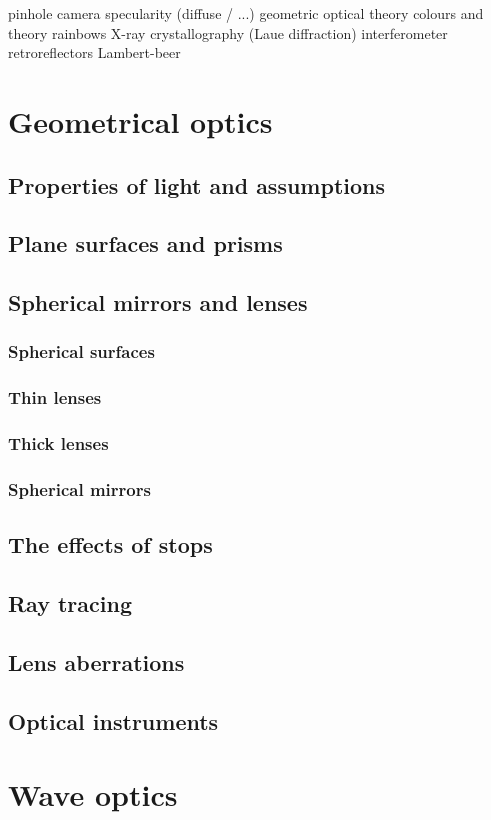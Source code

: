 pinhole camera
specularity (diffuse / ...)
geometric optical theory
colours and theory
rainbows
X-ray crystallography (Laue diffraction)
interferometer
retroreflectors
Lambert-beer


\chapter{Geometrical optics}
\section{Properties of light and assumptions}
\section{Plane surfaces and prisms}
\section{Spherical mirrors and lenses}
\subsection{Spherical surfaces}
\subsection{Thin lenses}
\subsection{Thick lenses}
\subsection{Spherical mirrors}
\section{The effects of stops}
\section{Ray tracing}
\section{Lens aberrations}
\section{Optical instruments}


\chapter{Wave optics}
